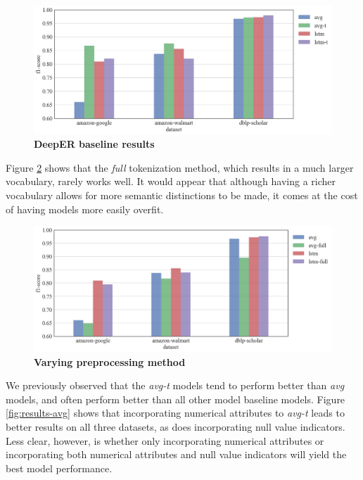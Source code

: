 \documentclass{proc}
\begin{document}
\begin{figure}
	\includegraphics[scale=0.22]{../imgs/results-avg-t.png}
	\caption{\textbf{DeepER baseline results}}
	\label{fig:results-avg-t}
\end{figure}

Figure \ref{fig:results-preprocessing} shows that the \textit{full} tokenization method, which results in a much larger vocabulary, rarely works well. It would appear that although having a richer vocabulary allows for more semantic distinctions to be made, it comes at the cost of having models more easily overfit.

\begin{figure}
	\includegraphics[scale=0.22]{../imgs/results-preprocessing.png}
	\caption{\textbf{Varying preprocessing method}}
	\label{fig:results-preprocessing}
\end{figure}

We previously observed that the \textit{avg-t} models tend to perform better than \textit{avg} models, and often perform better than all other model baseline models. Figure \ref{fig:results-avg} shows that incorporating numerical attributes to \textit{avg-t} leads to better results on all three datasets, as does incorporating null value indicators. Less clear, however, is whether only incorporating numerical attributes or incorporating both numerical attributes and null value indicators will yield the best model performance.
\end{document}
